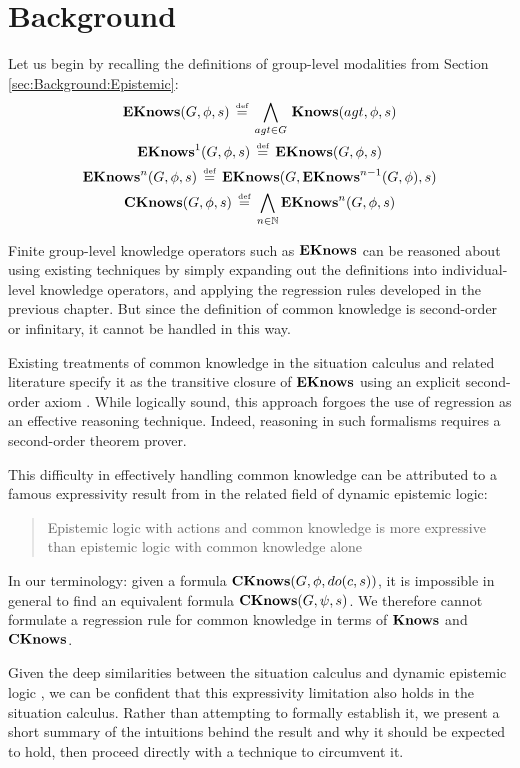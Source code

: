 \section{Background\label{sec:CKnowledge:Background}}

Let us begin by recalling the definitions of group-level modalities
from Section \ref{sec:Background:Epistemic}:\begin{gather*}
\mathbf{EKnows}(G,\phi,s)\,\stackrel{\mbox{\tiny def}}{=}\,\bigwedge_{agt\in G}\,\mathbf{Knows}(agt,\phi,s)\\
\mathbf{EKnows}^{1}(G,\phi,s)\,\stackrel{\mbox{\tiny def}}{=}\,\mathbf{EKnows}(G,\phi,s)\\
\mathbf{EKnows}^{n}(G,\phi,s)\,\stackrel{\mbox{\tiny def}}{=}\,\mathbf{EKnows}(G,\mathbf{EKnows}^{n-1}(G,\phi),s)\\
\mathbf{CKnows}(G,\phi,s)\,\stackrel{\mbox{\tiny def}}{=}\,\bigwedge_{n\in\mathbb{N}}\mathbf{EKnows}^{n}(G,\phi,s)\end{gather*}


Finite group-level knowledge operators such as $\mathbf{EKnows}$ can be reasoned
about using existing techniques by simply expanding out the definitions
into individual-level knowledge operators, and applying the regression
rules developed in the previous chapter. But since the definition
of common knowledge is second-order or infinitary, it cannot be handled
in this way.

Existing treatments of common knowledge in the situation calculus
and related literature specify it as the transitive closure of $\mathbf{EKnows}$
using an explicit second-order axiom \citep{davis05fo_ma_theory,ghaderi07sc_joint_ability}.
While logically sound, this approach forgoes the use of regression
as an effective reasoning technique. Indeed, reasoning in such formalisms
requires a second-order theorem prover.

This difficulty in effectively handling common knowledge can be attributed
to a famous expressivity result from \citet{baltag98pa_ck} in the
related field of dynamic epistemic logic:

\begin{quote}
Epistemic logic with actions and common knowledge is more expressive
than epistemic logic with common knowledge alone 
\end{quote}
In our terminology: given a formula $\mathbf{CKnows}(G,\phi,do(c,s))$, it
is impossible in general to find an equivalent formula $\mathbf{CKnows}(G,\psi,s)$.
We therefore cannot formulate a regression rule for common knowledge
in terms of $\mathbf{Knows}$ and $\mathbf{CKnows}$.

Given the deep similarities between the situation calculus and dynamic
epistemic logic \citep{vanbentham07ml_sitcalc}, we can be confident
that this expressivity limitation also holds in the situation calculus.
Rather than attempting to formally establish it, we present a short
summary of the intuitions behind the result and why it should be expected
to hold, then proceed directly with a technique to circumvent it.

